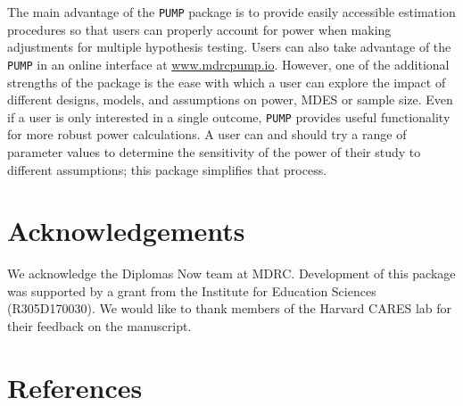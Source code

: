 \documentclass[
]{article}
\begin{document}
The main advantage of the \texttt{PUMP} package is to provide easily
accessible estimation procedures so that users can properly account for
power when making adjustments for multiple hypothesis testing. Users can
also take advantage of the \texttt{PUMP} in an online interface at
\url{www.mdrcpump.io}. However, one of the additional strengths of the
package is the ease with which a user can explore the impact of
different designs, models, and assumptions on power, MDES or sample
size. Even if a user is only interested in a single outcome,
\texttt{PUMP} provides useful functionality for more robust power
calculations. A user can and should try a range of parameter values to
determine the sensitivity of the power of their study to different
assumptions; this package simplifies that process.

\section*{Acknowledgements}

We acknowledge the Diplomas Now team at MDRC. Development of this
package was supported by a grant from the Institute for Education
Sciences (R305D170030). We would like to thank members of the Harvard
CARES lab for their feedback on the manuscript.

\section{References}
\end{document}
